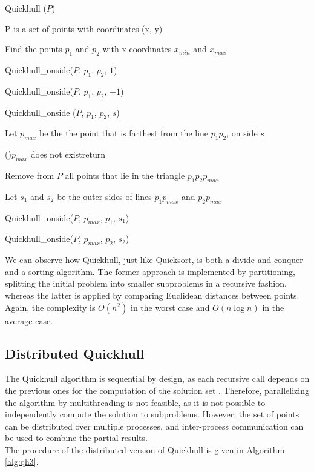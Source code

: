 \documentclass[]{finalproject}
\begin{document}
\begin{algorithm}
    \caption{Quickhull ($P$)}
    \label{alg:qh1}
    P is a set of points with coordinates (x, y)

    Find the points $p_1$ and $p_2$ with x-coordinates $x_{min}$ and $x_{max}$

    Quickhull\_onside($P$, $p_1$, $p_2$, $1$)

    Quickhull\_onside($P$, $p_1$, $p_2$, $-1$)
\end{algorithm}
\begin{algorithm}
  \caption{Quickhull\_onside ($P$, $p_1$, $p_2$, $s$)}
  \label{alg:qh2}
  Let $p_{max}$ be the the point that is farthest from the line $p_1p_2$, on side $s$

  \If(){$p_{max}$ does not exist}{return}

  Remove from $P$ all points that lie in the triangle $p_1p_2p_{max}$

  Let $s_1$ and $s_2$ be the outer sides of lines $p_1p_{max}$ and $p_2p_{max}$

  Quickhull\_onside($P$, $p_{max}$, $p_1$, $s_1$)

  Quickhull\_onside($P$, $p_{max}$, $p_2$, $s_2$)
\end{algorithm}

We can observe how Quickhull, just like Quicksort,
is both a divide-and-conquer and a sorting algorithm. The former approach is implemented by partitioning,
splitting the initial problem into smaller subproblems in a recursive fashion, whereas the latter is applied by comparing
Euclidean distances between points. Again, the complexity is $O(n^2)$ in the worst case and $O(n\log{n})$ in the average case.

\subsection{Distributed Quickhull}
The Quickhull algorithm is sequential by design,
as each recursive call depends on the previous ones for the computation of the solution set \cite{rameshconvex}.
Therefore, parallelizing the algorithm by multithreading is not feasible, as it is not possible to independently compute the solution to subproblems.
However, the set of points can be distributed over multiple processes, and inter-process communication can be used to combine the partial results.\\
The procedure of the distributed version of Quickhull is given in Algorithm \ref{alg:qh3}.
\end{document}
